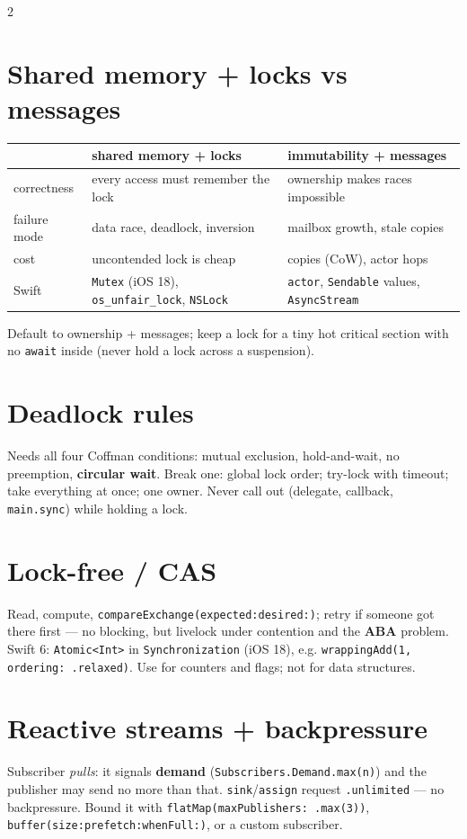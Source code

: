 \documentclass[8pt]{extarticle}
\newcommand\ct[1]{\texttt{#1}}
\begin{document}
\begin{multicols}{2}
\columnbreak

\section{Shared memory + locks vs messages}
{\scriptsize
\begin{tabular}{@{}>{\raggedright\arraybackslash}p{17mm}>{\raggedright\arraybackslash}p{27mm}>{\raggedright\arraybackslash}p{27mm}@{}}
\toprule
& \textbf{shared memory + locks} & \textbf{immutability + messages}\\
\midrule
correctness & every access must remember the lock & ownership makes races impossible\\
failure mode & data race, deadlock, inversion & mailbox growth, stale copies\\
cost & uncontended lock is cheap & copies (CoW), actor hops\\
Swift & \ct{Mutex} (iOS 18), \ct{os\_unfair\_lock}, \ct{NSLock} & \ct{actor}, \ct{Sendable} values, \ct{AsyncStream}\\
\bottomrule
\end{tabular}}
Default to ownership + messages; keep a lock for a tiny hot critical section
with no \ct{await} inside (never hold a lock across a suspension).

\section{Deadlock rules}
Needs all four Coffman conditions: mutual exclusion, hold-and-wait, no
preemption, \textbf{circular wait}. Break one: global lock order; try-lock
with timeout; take everything at once; one owner. Never call out
(delegate, callback, \ct{main.sync}) while holding a lock.

\section{Lock-free / CAS}
Read, compute, \ct{compareExchange(expected:desired:)}; retry if someone got
there first — no blocking, but livelock under contention and the
\textbf{ABA} problem. Swift 6: \ct{Atomic<Int>} in \ct{Synchronization}
(iOS 18), e.g. \ct{wrappingAdd(1, ordering: .relaxed)}. Use for counters and
flags; not for data structures.

\section{Reactive streams + backpressure}
Subscriber \emph{pulls}: it signals \textbf{demand} (\ct{Subscribers.Demand.max(n)})
and the publisher may send no more than that. \ct{sink}/\ct{assign} request
\ct{.unlimited} — no backpressure. Bound it with
\ct{flatMap(maxPublishers: .max(3))}, \ct{buffer(size:prefetch:whenFull:)},
or a custom subscriber.


\end{multicols}
\end{document}
